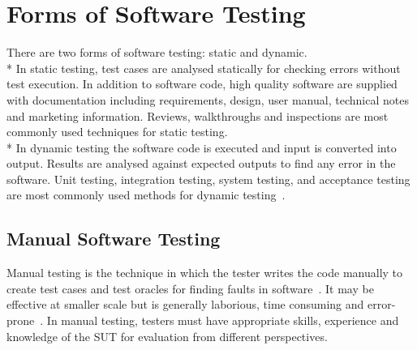 \section{Forms of Software Testing}
There are two forms of software testing: static and dynamic. \\*
In static testing, test cases are analysed statically for checking errors without test execution. In addition to software code, high quality software are supplied with documentation including requirements, design, user manual, technical notes and marketing information. Reviews, walkthroughs and inspections are most commonly used techniques for static testing.\\*
In dynamic testing the software code is executed and input is converted into output. Results are analysed against expected outputs to find any error in the software. Unit testing, integration testing, system testing, and acceptance testing are most commonly used methods for dynamic testing~\cite{fairley1978tutorial}.


\subsection{Manual Software Testing}
Manual testing is the technique in which the tester writes the code manually to create test cases and test oracles for finding faults in software~\cite{ciupa2008finding}. It may be effective at smaller scale but is generally laborious, time consuming and error-prone~\cite{tretmans2000automatic}. In manual testing, testers must have appropriate skills, experience and knowledge of the SUT for evaluation from different perspectives.
 
